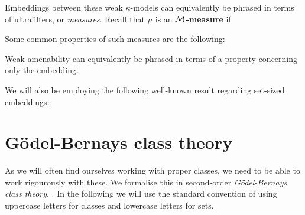 \documentclass[../../main]{subfiles}
\begin{document}
Embeddings between these weak $\kappa$-models can equivalently be phrased in terms of ultrafilters, or \textit{measures}. Recall that $\mu$ is an \textbf{$\operatorname{\mathcal M}$-measure} if

Some common properties of such measures are the following:


Weak amenability can equivalently be phrased in terms of a property concerning only the embedding.


We will also be employing the following well-known result regarding set-sized embeddings:




\section{G\"odel-Bernays class theory}
\label{prelims.gbc}

As we will often find ourselves working with proper classes, we need to be able to work rigourously with these. We formalise this in second-order \textit{G\"odel-Bernays class theory}, \gbc. In the following we will use the standard convention of using uppercase letters for classes and lowercase letters for sets.
\end{document}
